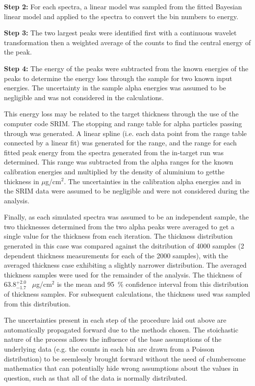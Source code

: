 \textbf{Step 2:}
  For each spectra, a linear model was sampled from the fitted Bayesian
  linear model and applied to the spectra to convert the bin numbers to
  energy.

\textbf{Step 3:}
  The two largest peaks were identified first with a continuous wavelet
  transformation then a weighted average of the counts to find the central
  energy of the peak.

\textbf{Step 4:}
  The energy of the peaks were subtracted from the known energies of the
  peaks to determine the energy loss through the sample for two known
  input energies. The uncertainty in the sample alpha energies was
  assumed to be negligible and was not considered in the calculations.

This energy loss may be related to the target thickness through the use
of the computer code SRIM. The stopping and range table for alpha
particles passing through  was generated. A linear spline
(i.e. each data point from the range table connected by a linear fit)
was generated for the range, and the range for each fitted peak energy
from the spectra generated from the in-target run was determined. This
range was subtracted from the alpha ranges for the known calibration
energies and multiplied by the density of aluminium to getthe thickness
in $\mu$g/cm${}^{2}$. The uncertainties in the calibration alpha energies and
in the SRIM data were assumed to be negligible and were not considered
during the analysis.

Finally, as each simulated spectra was assumed to be an independent
sample, the two thicknesses determined from the two alpha peaks were
averaged to get a single value for the thickness from each iteration.
The thickness distribution generated in this case was compared against
the dsitribution of 4000 samples (2 dependent thickness measurements for
each of the 2000 samples), with the averaged thickness case exhibiting a
slightly narrower distribution. The averaged thickness samples were used
for the remainder of the analysis. The thickness of $63.8^{+2.0}_{-1.7}$~
$\mu$g/cm${}^{2}$ is the mean and 95\, \% confidence interval from this
distribution of thickness samples. For subsequent calculations, the
thickness used was sampled from this distribution.

The uncertainties present in each step of the procedure laid out above
are automatically propagated forward due to the methods chosen. The
stoichastic nature of the process allows the influence of the base
assumptions of the underlying data (e.g. the counts in each bin are
drawn from a Poisson distribution) to be seemlessly brought forward
without the need of clumbersome mathematics that can potentially hide
wrong assumptions about the values in question, such as that all of the
data is normally distributed.

